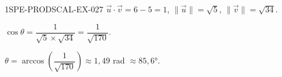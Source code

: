 \begin{corrige}{1SPE-PRODSCAL-EX-027}
$\vec{u} \cdot \vec{v} = 6 - 5 = 1$, $\|\vec{u}\| = \sqrt{5}$, $\|\vec{v}\| = \sqrt{34}$.

$\cos\theta = \dfrac{1}{\sqrt{5} \times \sqrt{34}} = \dfrac{1}{\sqrt{170}}$.

$\theta = \arccos\!\left(\dfrac{1}{\sqrt{170}}\right) \approx 1{,}49$ rad $\approx 85{,}6°$.
\end{corrige}
